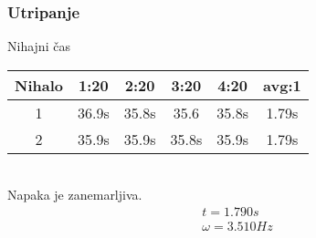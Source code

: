 \documentclass[a4paper]{article}
\begin{document}
\subsubsection{Utripanje}
Nihajni čas
\begin{table}[h]
  \centering
\begin{tabular}{*{6}{c}}
  Nihalo & 1:20 & 2:20 & 3:20 & 4:20 & avg:1\\\toprule
  1 & 36.9s & 35.8s & 35.6 & 35.8s & 1.79s \\\midrule
  2 & 35.9s & 35.9s & 35.8s & 35.9s & 1.79s \\\bottomrule
\end{tabular}
\end{table}\\
Napaka je zanemarljiva.
\begin{align*}
  t=1.790s\\
  \omega=3.510Hz
\end{align*}
\end{document}
